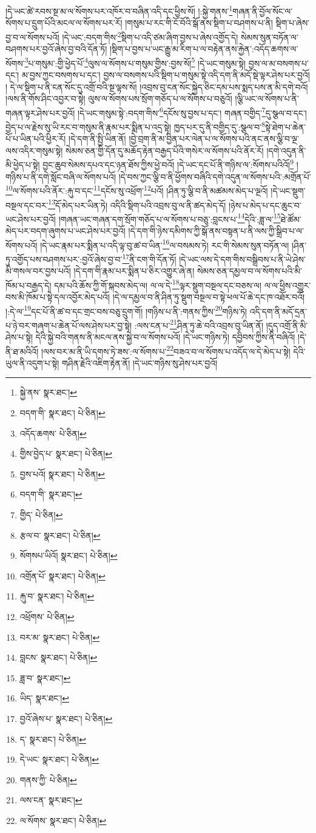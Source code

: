 །དེ་ཡང་ཚེ་རབས་སྔ་མ་ལ་སོགས་པར་འཁོར་བ་བཞིན་འདི་དང་ཕྱིས་སོ། །:སྐྱེ་གནས་\footnote{སྐྱེ་ནས་  སྣར་ཐང་། }གཞན་ནི་བྱོལ་སོང་ལ་སོགས་པ་དྲུག་པོའི་མངལ་ལ་སོགས་པར་རོ། །གསུམ་པ་རང་གི་ངོ་བོའི་སྒོ་ནས་སྡིག་པ་བཤགས་པ་ནི། སྡིག་པ་ཞེས་བྱ་བ་ལ་སོགས་པའོ། །དེ་ཡང་:བདག་གིས་\footnote{བདག་གི་  སྣར་ཐང་།  པེ་ཅིན། }སྡིག་པ་འདི་ཙམ་ཞིག་བྱས་པ་ཞེས་འགྱོད་དེ། སེམས་སུན་བཏོན་ལ་བཤགས་པར་བྱའོ་ཞེས་བྱ་བའི་དོན་ཏོ། །སྡིག་པ་བྱས་པ་ཡང་རྒྱུ་མ་རིག་པ་ལ་བརྟེན་ནས་རྐྱེན་:འདོད་ཆགས་ལ་སོགས་\footnote{འདོད་ཆགས་  པེ་ཅིན། }པ་གསུམ་:གྱི་ཕྱེད་པོ་\footnote{གྱིས་བྱེད་པ་  སྣར་ཐང་།  པེ་ཅིན། }ལུས་ལ་སོགས་པ་གསུམ་གྱིས་:བྱས་སོ།\footnote{བྱས་པའོ།  སྣར་ཐང་།  པེ་ཅིན། } །དེ་ཡང་གསུམ་སྟེ། བྱས་ལ་མ་བསགས་པ་དང་། མ་བྱས་ཀྱང་བསགས་པ་དང་། བྱས་ལ་བསགས་པའི་སྡིག་པ་གསུམ་སྟེ་འདི་དག་ནི་མདོ་སྡེ་ལྟར་ཤེས་པར་བྱའོ། །
དེ་ལ་སྡིག་པ་ནི་ངན་སོང་དུ་འགྲོ་བའི་སྔ་ལྟས་སོ། །འབྲས་བུ་ངན་སོང་སྐྱེད་ཅིང་དམ་པས་སྨད་པས་ན་མི་དགེ་བའོ། །ལས་ནི་གོས་ཤིང་འབྱར་བ་སྟེ། ལུས་ལ་སོགས་པས་སྲོག་གཅོད་པ་ལ་སོགས་པ་བཅུའོ། །ལྕི་ཡང་ལ་སོགས་པ་ནི་གཞན་ལྟར་ཤེས་པར་བྱའོ། །དེ་ཡང་གསུམ་སྟེ་:བདག་གིས་\footnote{བདག་གི་  སྣར་ཐང་། }དངོས་སུ་བྱས་པ་དང་། གཞན་བགྱིད་\footnote{གྱིད་  པེ་ཅིན། }དུ་སྩལ་བ་དང་། བྱེད་པ་ལ་རྗེས་སུ་ཡི་རང་བ་གསུམ་ནི་རྣམ་པར་སྨིན་པ་འདྲ་སྟེ། ཁྱད་པར་དུ་ནི་བགྱིད་དུ་:སྩལ་བ་\footnote{རྩལ་བ་  སྣར་ཐང་།  པེ་ཅིན། }སྟེ་ཐེག་པ་ཆེན་པོ་པ་ཡིན་པའི་ཕྱིར་རོ། །དེ་དག་ནི་སྤྱི་ཡིན་ནོ། །བྱེ་བྲག་ནི་མ་བྱིན་པར་ལེན་པ་ལ་སོགས་པའི་ནང་ནས་ལྕི་བ་ལྔ་ལས་འདིར་གསུམ་སྟེ། སེམས་ཅན་གྱི་དོན་དུ་མཆོད་རྟེན་བརྒྱད་པོའི་གསེར་ལ་སོགས་པའི་ནོར་རོ། །དགེ་འདུན་ནི་མི་ཕྱེད་པ་སྟེ། བྱང་ཆུབ་སེམས་དཔའ་དང་ཉན་ཐོས་ཀྱིས་ཕྱེ་བའོ། །དེ་ཡང་དང་པོ་ནི་གཉིས་ལ་:སོགས་པའིའོ།\footnote{སོགསཔ་ཡིའོ།  སྣར་ཐང་།  པེ་ཅིན། } །གཉིས་པ་ནི་དགེ་སློང་བཞི་ལ་སོགས་པའོ། །དེ་བས་ཀྱང་ལྕི་བ་ནི་ཕྱོགས་བཞིའི་དགེ་འདུན་ལ་སོགས་པའི་:མགྲོན་པོ་\footnote{འགྲོན་པོ་  སྣར་ཐང་།  པེ་ཅིན། }ལ་སོགས་པའི་ནོར་:རྐུ་བ་དང་\footnote{རྐུ་བ་  སྣར་ཐང་།  པེ་ཅིན། }དངོས་སུ་འཕྲོག་\footnote{འཕྲོགས་  པེ་ཅིན། }པའོ། །ཤིན་ཏུ་ལྕི་བ་ནི་མཚམས་མེད་པ་ལྔའོ། །དེ་ཡང་སྡུག་བསྔལ་དང་བར་\footnote{བར་མ་  སྣར་ཐང་།  པེ་ཅིན། }དོ་མེད་པར་ཡིན་ཏེ། འདིའི་སྡིག་པའི་འབྲས་བུ་ལ་ནི་ཚད་མེད་དོ། །ཉེས་པ་མེད་པ་དང་ཆུང་བ་ཡང་ཤེས་པར་བྱའོ། །གཞན་ཡང་གཞན་དག་སྲོག་གཅོད་པ་ལ་སོགས་པ་བཅུ་:བླངས་པ་\footnote{བླངས་  སྣར་ཐང་།  པེ་ཅིན། }དེའི་:ཟླ་ལ་\footnote{ཟླ་བ་  སྣར་ཐང་། }ཐེ་ཚོམ་མེད་པར་བདག་ཞུགས་པ་ཡང་ཤེས་པར་བྱའོ། །དེ་དག་གི་ཉེས་དམིགས་ཀྱི་སྒོ་ནས་བསྟན་པ་ནི་ལས་ཀྱི་སྒྲིབ་པ་ལ་སོགས་པའོ། །དེ་ཡང་རྣམ་པར་སྨིན་པ་འདི་ལྟ་བུ་ཚ་བ་ཡིན་\footnote{ཡིད་  སྣར་ཐང་། }ལ་བསམས་ཏེ། རང་གི་སེམས་སུན་བཏོན་ལ། །ཤིན་ཏུ་འགྱོད་པས་བཤགས་པར་:བྱའོ་ཞེས་བྱ་བ་\footnote{བྱའོ་ཞེས་པ་  སྣར་ཐང་།  པེ་ཅིན། }ནི་ངག་གི་དོན་ཏོ། །དེ་ཡང་ལས་དེ་དག་གིས་བསྒྲིབས་པ་ནི་ཡེ་ཤེས་མི་གསལ་བར་བྱས་པའོ། །དེ་དག་གི་རྣམ་པར་སྨིན་པ་ཅིར་འགྱུར་ཞེ་ན། སེམས་ཅན་དམྱལ་བ་ལ་སོགས་པའི་མི་ཁོམ་པ་བརྒྱད་དེ། དམ་པའི་ཆོས་ཀྱི་གོ་སྐབས་མེད་ལ། ལ་ལ་དེ་\footnote{ད་  སྣར་ཐང་།  པེ་ཅིན། }ལྟར་སྡུག་བསྔལ་དང་བཅས་ལ། ལ་ལ་ཕྱིས་འགྱུར་བས་མི་ཁོམ་པ་སྟེ་དལ་འབྱོར་མེད་པའོ། །དེ་ལ་དམྱལ་བ་ནི་ཤིན་ཏུ་སྡུག་བསྔལ་བ་སྟེ་ཕལ་པོ་ཆེ་དང་ཁ་འཐོར་བའོ། །:དེ་ལ་\footnote{དེ་ཡང་  སྣར་ཐང་།  པེ་ཅིན། }དང་པོ་ནི་ཚ་བ་དང་གྲང་བས་བཅུ་དྲུག་གོ། །གཉིས་པ་ནི་:གནས་ཀྱིས་\footnote{གནས་ཀྱི་  པེ་ཅིན། }གཉིས་ཏེ། འདི་དག་ནི་མདོ་དྲན་པ་ཉེ་བར་གཞག་པ་ཆེན་པོ་ལས་ཤེས་པར་བྱ་སྟེ། :ལས་ངན་པ་\footnote{ལས་ངན་  སྣར་ཐང་། }ཤིན་ཏུ་ཆེ་བའི་འབྲས་བུ་ཡིན་ནོ། །དུད་འགྲོ་ནི་མི་ཤེས་པ་སྟེ། དེའི་སྐྱེ་བའི་གནས་ནི་མངལ་ནས་སྐྱེ་བ་ལ་སོགས་པའོ། །དེ་ཡང་གཉིས་ཏེ། དབྱིབས་ཀྱིས་ནི་བཞིའོ། །དེ་ནི་ཐ་མའིའོ། །ལས་བར་མ་ནི་ཡི་དགས་ཏེ་ཟས་:ལ་སོགས་པ་\footnote{ལ་སོགས་  སྣར་ཐང་།  པེ་ཅིན། }བཟའ་བ་ལ་སོགས་པ་འདོད་ལ་དེ་མེད་པ་སྟེ། དེའི་ཡུལ་ནི་འདུག་པ་སྟེ། གཤིན་རྗེའི་འཇིག་རྟེན་ནོ། །དེ་ཡང་གཉིས་སུ་ཤེས་པར་བྱའོ། 